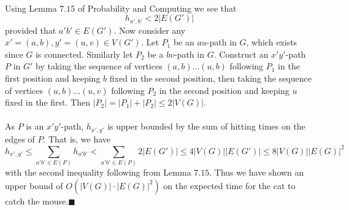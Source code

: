\documentclass[letterpaper,12pt,oneside,onecolumn]{article}
\begin{document}
\paragraph{}
Using Lemma $7.15$ of Probability and Computing we see that 
$$h_{a',b'} < 2|E(G')|$$
provided that $a'b' \in E(G')$. Now consider any $x'=(a,b), y'=(u,v) \in V(G')$. Let $P_1$ be an $au$-path in $G$, which exists since $G$ is connected. Similarly let $P_2$ be a $bv$-path in $G$. Construct an $x'y'$-path $P$ in $G'$ by taking the sequence of vertices $(a,b) \dots (u,b)$ following $P_1$ in the first position and keeping $b$ fixed in the second position, then taking the sequence of vertices $(u,b) \dots (u,v)$ following $P_2$ in the second position and keeping $u$ fixed in the first. Then $|P_2|  = |P_1| + |P_2| \leq 2|V(G)|$.
\paragraph{}
As $P$ is an $x'y'$-path, $h_{x',y'}$ is upper bounded by the sum of hitting times on the edges of $P$. That is, we have
$$h_{x',y'} \leq \sum_{a'b' \in E(P)} h_{a'b'} <  \sum_{a'b' \in E(P)} 2|E(G')| \leq 4|V(G)||E(G')| \leq 8|V(G)||E(G)|^2$$
with the second inequality following from Lemma $7.15$. Thus we have shown an upper bound of $O(|V(G)|\cdot|E(G)|^2)$ on the expected time for the cat to catch the mouse.$\blacksquare$
\end{document}
